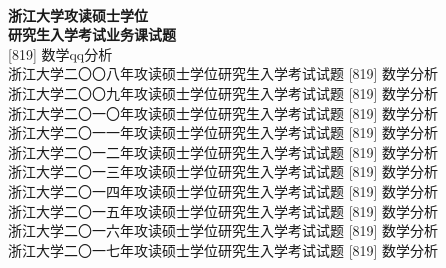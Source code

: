 \documentclass[UTF8,a4paper,11pt]{article}
\begin{document}
\renewcommand{\headrulewidth}{0pt}
\pagestyle{fancy}
\newcommand{\sh}{\mathrm{sh}}
\renewcommand{\Im}{\mathrm{Im}}
\newcommand{\rank}{\mathrm{rank}}
\renewcommand{\i}{\mathrm{i}}
\newcommand{\e}{\mathrm{e}}
\newcommand{\ud}[1]{\mathrm{d}#1}
\newcommand{\sgn}{\mathrm{sgn}}
\renewcommand{\emptyset}{\varnothing}
\setlength{\fboxsep}{8pt}
\fancypage{\fbox}{}
\begin{center}
	\mbox{}\\
	{\Huge\bf 浙江大学攻读硕士学位\\
		研究生入学考试业务课试题\\}
	{\huge [819] 数学qq分析}\\
	浙江大学二〇〇八年攻读硕士学位研究生入学考试试题 [819] 数学分析\\
	浙江大学二〇〇九年攻读硕士学位研究生入学考试试题 [819] 数学分析\\
	浙江大学二〇一〇年攻读硕士学位研究生入学考试试题 [819] 数学分析\\
	浙江大学二〇一一年攻读硕士学位研究生入学考试试题 [819] 数学分析\\
	浙江大学二〇一二年攻读硕士学位研究生入学考试试题 [819] 数学分析\\
	浙江大学二〇一三年攻读硕士学位研究生入学考试试题 [819] 数学分析\\
	浙江大学二〇一四年攻读硕士学位研究生入学考试试题 [819] 数学分析\\
	浙江大学二〇一五年攻读硕士学位研究生入学考试试题 [819] 数学分析\\
	浙江大学二〇一六年攻读硕士学位研究生入学考试试题 [819] 数学分析\\
	浙江大学二〇一七年攻读硕士学位研究生入学考试试题 [819] 数学分析\\
	\mbox{}
\end{center}
\newpage
\end{document}
